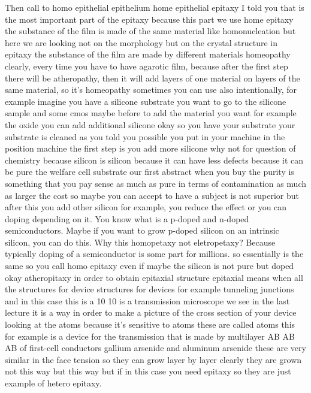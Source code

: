 Then call to homo epithelial epithelium home epithelial epitaxy I told you that is the most important part of the epitaxy because this part we use home epitaxy the substance of the film is made of the same material like homonucleation but here we are looking not on the morphology but on the crystal structure in epitaxy the substance of the film are made by different materials homeopathy clearly, every time you have to have agarotic film, because after the first step there will be atheropathy, then it will add layers of one material on layers of the same material, so it's homeopathy sometimes you can use also intentionally, for example imagine you have a silicone substrate you want to go to the silicone sample and some cmos maybe before to add the material you want for example the oxide you can add additional silicone okay so you have your substrate your substrate is cleaned as you told you possible you put in your machine in the position machine the first step is you add more silicone why not for question of chemistry because silicon is silicon because it can have less defects because it can be pure the welfare cell substrate our first abstract when you buy the purity is something that you pay sense as much as pure in terms of contamination as much as larger the cost so maybe you can accept to have a subject is not superior but after this you add other silicon for example, you reduce the effect or you can doping depending on it. You know what is a p-doped and n-doped semiconductors. Maybe if you want to grow p-doped silicon on an intrinsic silicon, you can do this. Why this homopetaxy not eletropetaxy? Because typically doping of a semiconductor is some part for millions. so essentially is the same so you call homo epitaxy even if maybe the silicon is not pure but doped okay atheropitaxy in order to obtain epitaxial structure epitaxial means when all the structures for device structures for devices for example tunneling junctions and in this case this is a 10 10 is a transmission microscope we see in the last lecture it is a way in order to make a picture of the cross section of your device looking at the atoms because it's sensitive to atoms these are called atoms this for example is a device for the transmission that is made by multilayer AB AB AB of first-cell conductors gallium arsenide and aluminum arsenide these are very similar in the face tension so they can grow layer by layer clearly they are grown not this way but this way but if in this case you need epitaxy so they are just example of hetero epitaxy.
